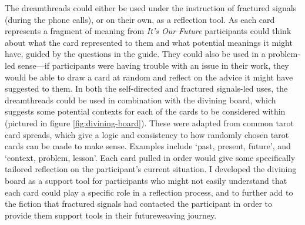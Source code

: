The dreamthreads could either be used under the instruction of fractured signals (during the phone calls), or on their own, as a reflection tool. As each card represents a fragment of meaning from \textit{It’s Our Future} participants could think about what the card represented to them and what potential meanings it might have, guided by the questions in the guide. They could also be used in a problem-led sense—if participants were having trouble with an issue in their work, they would be able to draw a card at random and reflect on the advice it might have suggested to them. In both the self-directed and fractured signals-led uses, the dreamthreads could be used in combination with the divining board, which suggests some potential contexts for each of the cards to be considered within (pictured in figure \ref{fig:divining-board}). These were adapted from common tarot card spreads, which give a logic and consistency to how randomly chosen tarot cards can be made to make sense. Examples include ‘past, present, future’, and ‘context, problem, lesson’. Each card pulled in order would give some specifically tailored reflection on the participant's current situation. I developed the divining board as a support tool for participants who might not easily understand that each card could play a specific role in a reflection process, and to further add to the fiction that fractured signals had contacted the participant in order to provide them support tools in their futureweaving journey.
